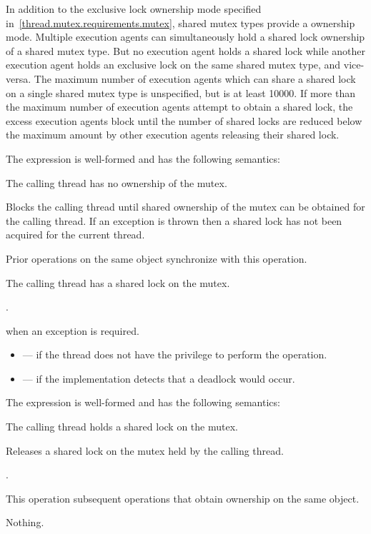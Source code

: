 \pnum
{}%
In addition to the exclusive lock ownership mode specified
in~\ref{thread.mutex.requirements.mutex}, shared mutex types provide a
 ownership mode. Multiple execution agents can
simultaneously hold a shared lock ownership of a shared mutex type. But no
execution agent holds a shared lock while another execution agent holds an
exclusive lock on the same shared mutex type, and vice-versa. The maximum
number of execution agents which can share a shared lock on a single shared
mutex type is unspecified, but is at least 10000. If more than the
maximum number of execution agents attempt to obtain a shared lock, the
excess execution agents block until the number of shared locks are
reduced below the maximum amount by other execution agents releasing their
shared lock.

\pnum
The expression  is well-formed and has the
following semantics:
\begin{itemdescr}
\pnum
\expects
The calling thread has no ownership of the mutex.

\pnum
{}%
\effects
Blocks the calling thread until shared ownership of the mutex can be obtained for the calling thread.
If an exception is thrown then a shared lock has not been acquired for the current thread.

\pnum
\sync
Prior  operations on the same object synchronize with this operation.

\pnum
\ensures
The calling thread has a shared lock on the mutex.

\pnum
\returntype {}.

\pnum
\throws
{} when an exception is required.

\pnum
\errors
\begin{itemize}
\item {} --- if the thread does not have the privilege to perform the operation.
\item {} --- if the implementation detects that a deadlock would occur.
\end{itemize}
\end{itemdescr}

\pnum
The expression  is well-formed and has the following semantics:
\begin{itemdescr}
\pnum
\expects
The calling thread holds a shared lock on the mutex.

\pnum
\effects
Releases a shared lock on the mutex held by the calling thread.

\pnum
\returntype {}.

\pnum
\sync
This operation  subsequent
 operations that obtain ownership on the same object.

\pnum
\throws
Nothing.
\end{itemdescr}

